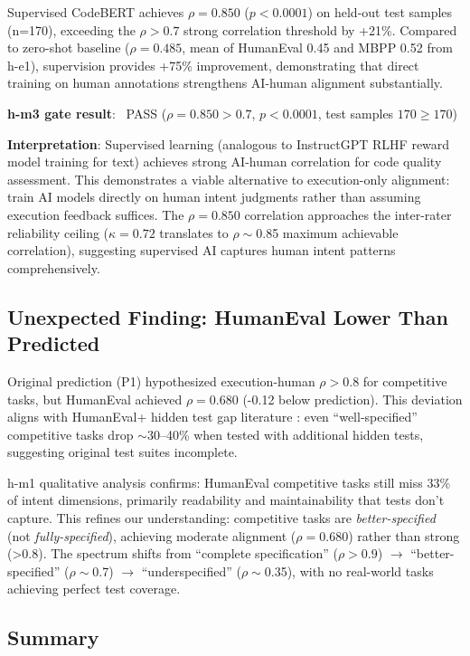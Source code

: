 Supervised CodeBERT achieves $\rho=0.850$ ($p<0.0001$) on held-out test samples (n=170), exceeding the $\rho>0.7$ strong correlation threshold by +21\%. Compared to zero-shot baseline ($\rho=0.485$, mean of HumanEval 0.45 and MBPP 0.52 from h-e1), supervision provides +75\% improvement, demonstrating that direct training on human annotations strengthens AI-human alignment substantially.

\textbf{h-m3 gate result}: \checkmark\ PASS ($\rho=0.850>0.7$, $p<0.0001$, test samples $170\geq170$)

\textbf{Interpretation}: Supervised learning (analogous to InstructGPT RLHF reward model training for text) achieves strong AI-human correlation for code quality assessment. This demonstrates a viable alternative to execution-only alignment: train AI models directly on human intent judgments rather than assuming execution feedback suffices. The $\rho=0.850$ correlation approaches the inter-rater reliability ceiling ($\kappa=0.72$ translates to $\rho\sim$0.85 maximum achievable correlation), suggesting supervised AI captures human intent patterns comprehensively.

\subsection{Unexpected Finding: HumanEval Lower Than Predicted}

Original prediction (P1) hypothesized execution-human $\rho>0.8$ for competitive tasks, but HumanEval achieved $\rho=0.680$ (-0.12 below prediction). This deviation aligns with HumanEval+ hidden test gap literature \cite{liu2023your}: even ``well-specified'' competitive tasks drop $\sim$30--40\% when tested with additional hidden tests, suggesting original test suites incomplete.

h-m1 qualitative analysis confirms: HumanEval competitive tasks still miss 33\% of intent dimensions, primarily readability and maintainability that tests don't capture. This refines our understanding: competitive tasks are \emph{better-specified} (not \emph{fully-specified}), achieving moderate alignment ($\rho=0.680$) rather than strong (>0.8). The spectrum shifts from ``complete specification'' ($\rho>0.9$) $\rightarrow$ ``better-specified'' ($\rho\sim$0.7) $\rightarrow$ ``underspecified'' ($\rho\sim$0.35), with no real-world tasks achieving perfect test coverage.

\subsection{Summary}

